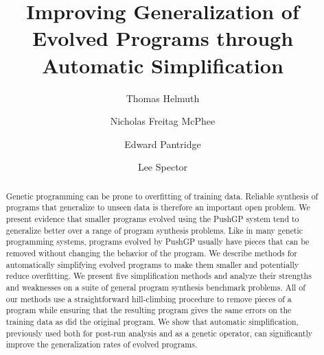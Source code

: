 \documentclass[sigconf]{acmart}
\begin{document}
\title{Improving Generalization of Evolved Programs through Automatic Simplification}


\author{Thomas Helmuth}

\author{Nicholas Freitag McPhee}

\author{Edward Pantridge}

\author{Lee Spector}



\begin{abstract}
Genetic programming can be prone to overfitting of training data. Reliable synthesis of programs that generalize to unseen data is therefore an important open problem. We present evidence that smaller programs evolved using the PushGP system tend to generalize better over a range of program synthesis problems. Like in many genetic programming systems, programs evolved by PushGP usually have pieces that can be removed without changing the behavior of the program. We describe methods for automatically simplifying evolved programs to make them smaller and potentially reduce overfitting. We present five simplification methods and analyze their strengths and weaknesses on a suite of general program synthesis benchmark problems. All of our methods use a straightforward hill-climbing procedure to remove pieces of a program while ensuring that the resulting program gives the same errors on the training data as did the original program. We show that automatic simplification, previously used both for post-run analysis and as a genetic operator, can significantly improve the generalization rates of evolved programs.
\end{abstract}
\end{document}
